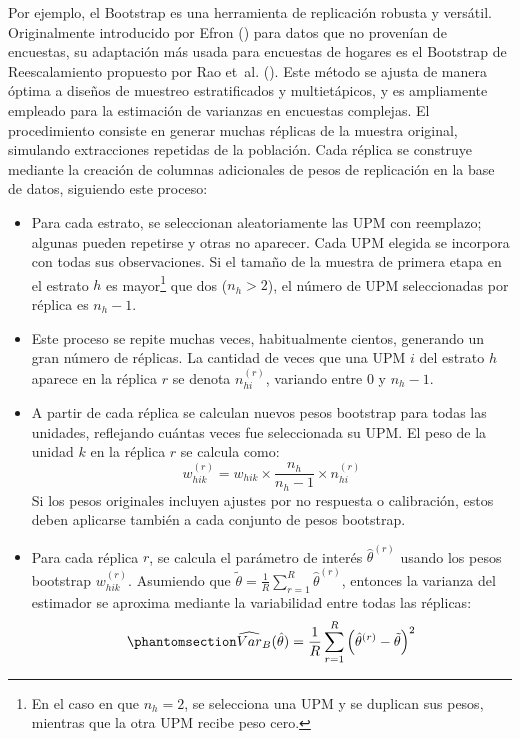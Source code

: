 \documentclass[
  spanish,
  11pt,
  letterpaper,
  oneside,
  open=any]{scrbook}
\providecommand{\tightlist}{%
  \setlength{\itemsep}{0pt}\setlength{\parskip}{0pt}}
\begin{document}
Por ejemplo, el Bootstrap es una herramienta de replicación robusta y
versátil. Originalmente introducido por Efron
() para datos que no provenían de
encuestas, su adaptación más usada para encuestas de hogares es el
Bootstrap de Reescalamiento propuesto por Rao et~al.
(). Este método se ajusta de
manera óptima a diseños de muestreo estratificados y multietápicos, y es
ampliamente empleado para la estimación de varianzas en encuestas
complejas. El procedimiento consiste en generar muchas réplicas de la
muestra original, simulando extracciones repetidas de la población. Cada
réplica se construye mediante la creación de columnas adicionales de
pesos de replicación en la base de datos, siguiendo este proceso:

\begin{itemize}
\tightlist
\item
  Para cada estrato, se seleccionan aleatoriamente las UPM con
  reemplazo; algunas pueden repetirse y otras no aparecer. Cada UPM
  elegida se incorpora con todas sus observaciones. Si el tamaño de la
  muestra de primera etapa en el estrato \(h\) es mayor\footnote{En el
    caso en que \(n_h = 2\), se selecciona una UPM y se duplican sus
    pesos, mientras que la otra UPM recibe peso cero.} que dos
  (\(n_h > 2\)), el número de UPM seleccionadas por réplica es
  \(n_h - 1\).
\item
  Este proceso se repite muchas veces, habitualmente cientos, generando
  un gran número de réplicas. La cantidad de veces que una UPM \(i\) del
  estrato \(h\) aparece en la réplica \(r\) se denota \(n_{hi}^{(r)}\),
  variando entre 0 y \(n_h - 1\).
\item
  A partir de cada réplica se calculan nuevos pesos bootstrap para todas
  las unidades, reflejando cuántas veces fue seleccionada su UPM. El
  peso de la unidad \(k\) en la réplica \(r\) se calcula como:
  \[w_{hik}^{(r)} = w_{hik} \times \frac{n_h}{n_h - 1} \times n_{hi}^{(r)}\]
  Si los pesos originales incluyen ajustes por no respuesta o
  calibración, estos deben aplicarse también a cada conjunto de pesos
  bootstrap.
\item
  Para cada réplica \(r\), se calcula el parámetro de interés
  \(\hat{\theta}^{(r)}\) usando los pesos bootstrap \(w_{hik}^{(r)}\).
  Asumiendo que
  \(\tilde{\theta} = \frac{1}{R} \sum_{r=1}^{R} \hat{\theta}^{(r)}\),
  entonces la varianza del estimador se aproxima mediante la
  variabilidad entre todas las réplicas:
  \begin{equation}\protect\phantomsection\label{eq-varianza-bootstrap}{\widehat{Var}_B(\hat{\theta}) = \frac{1}{R} \sum_{r=1}^{R} \left(\hat{\theta}^{(r)} - \tilde{\theta}\right)^2}\end{equation}
\end{itemize}
\end{document}
